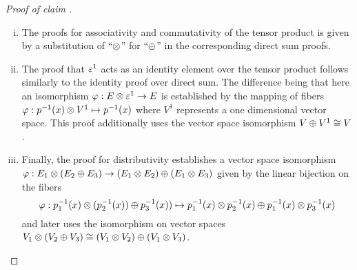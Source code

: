 \documentclass[../../sean_thesis.tex]{subfiles}
\begin{document}
\begin{proof}[Proof of claim ]
\begin{enumerate}[(i)]
		\item The proofs for associativity and commutativity of the tensor product is given by a substitution of ``$\otimes$'' for ``$\oplus$'' in the corresponding direct sum proofs.
		
		\item The proof that $\varepsilon^{1}$ acts as an identity element over the tensor product follows similarly to the identity proof over direct sum. The difference being that here an isomorphism $\varphi: E \otimes \varepsilon^{1} \to E$ is established by the mapping of fibers $\varphi: p^{-1}(x) \otimes V^{1} \mapsto p^{-1}(x)$ where $V^{1}$ represents a one dimensional vector space. This proof additionally uses the vector space isomorphism $V \oplus V^{1} \cong V$.
		
		\item Finally, the proof for distributivity establishes a vector space isomorphism $\varphi: E_1 \otimes (E_2 \oplus E_3) \to (E_1 \otimes E_2) \oplus (E_1 \otimes E_3)$ given by the linear bijection on the fibers
		\begin{equation*}
			\varphi: p^{-1}_1(x) \otimes (p^{-1}_2(x)) \oplus p^{-1}_3(x)) \mapsto p^{-1}_1(x) \otimes p^{-1}_2(x) \oplus p^{-1}_1(x) \otimes p^{-1}_3(x)
		\end{equation*}
		and later uses the isomorphism on vector spaces $V_1 \otimes (V_2 \oplus V_3) \cong (V_1 \otimes V_2) \oplus (V_1 \otimes V_3)$.
	\end{enumerate}
\end{proof}
\end{document}
